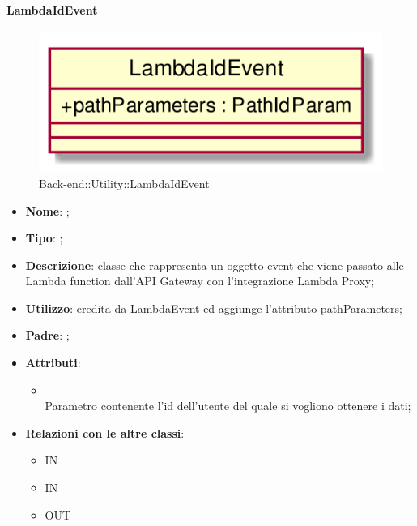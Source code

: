 \hypertarget{LambdaIdEvent_label}{\paragraph{LambdaIdEvent}}
\begin{figure}[h]
	\centering
	\includegraphics[width=\textwidth,height=\textheight,keepaspectratio]{images/ClassLambdaIdEvent.png}
	\caption{Back-end::Utility::LambdaIdEvent}
\end{figure}
\begin{itemize}
	\item \textbf{Nome}: ;
	\item \textbf{Tipo}: ;
	\item \textbf{Descrizione}: classe che rappresenta un oggetto event che viene passato alle Lambda function dall'API Gateway con l'integrazione Lambda Proxy;
	\item \textbf{Utilizzo}: eredita da LambdaEvent ed aggiunge l'attributo pathParameters;
	\item \textbf{Padre}: ;
	\item \textbf{Attributi}:
	\begin{itemize}
		\item[]  \\
		Parametro contenente l'id dell'utente del quale si vogliono ottenere i dati;
	\end{itemize}
	\item \textbf{Relazioni con le altre classi}:
	\begin{itemize}
		\item IN \hyperlink{RulesService_label}{}
		\item IN \hyperlink{UsersService_label}{}
		\item OUT \hyperlink{PathIdParam_label}{}
	\end{itemize}
\end{itemize}
\FloatBarrier


